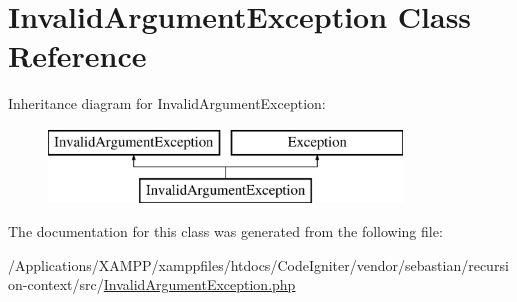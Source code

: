 \hypertarget{class_sebastian_bergmann_1_1_recursion_context_1_1_invalid_argument_exception}{}\section{Invalid\+Argument\+Exception Class Reference}
\label{class_sebastian_bergmann_1_1_recursion_context_1_1_invalid_argument_exception}
Inheritance diagram for Invalid\+Argument\+Exception\+:\begin{figure}[H]
\begin{center}
\leavevmode
\includegraphics[height=2.000000cm]{class_sebastian_bergmann_1_1_recursion_context_1_1_invalid_argument_exception}
\end{center}
\end{figure}


The documentation for this class was generated from the following file\+:\begin{DoxyCompactItemize}
\item 
/\+Applications/\+X\+A\+M\+P\+P/xamppfiles/htdocs/\+Code\+Igniter/vendor/sebastian/recursion-\/context/src/\mbox{\hyperlink{sebastian_2recursion-context_2src_2_invalid_argument_exception_8php}{Invalid\+Argument\+Exception.\+php}}\end{DoxyCompactItemize}
